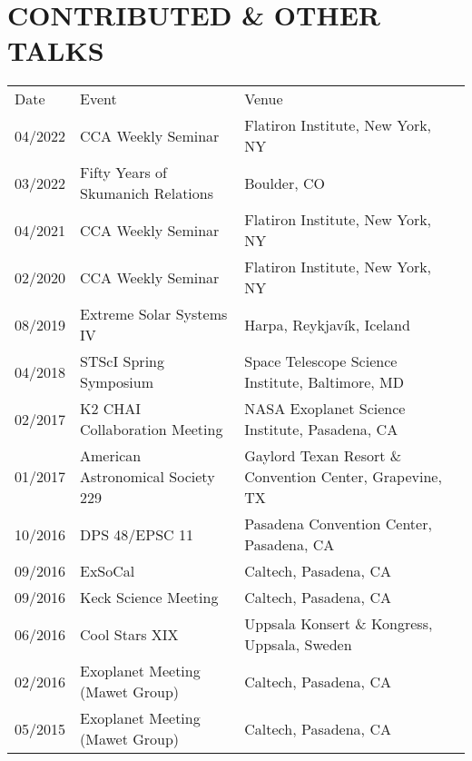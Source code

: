 \section{\large CONTRIBUTED \& OTHER TALKS}
\begin{tabular}{lll}
{\sc  Date}  & {\sc  Event} & {\sc  Venue} \\
04/2022 & CCA Weekly Seminar & Flatiron Institute, New York, NY\\
03/2022 & Fifty Years of Skumanich Relations & Boulder, CO \\
04/2021 & CCA Weekly Seminar & Flatiron Institute, New York, NY\\
02/2020 & CCA Weekly Seminar & Flatiron Institute, New York, NY\\
08/2019 & Extreme Solar Systems IV & Harpa, Reykjav\'{i}k, Iceland \\ %
04/2018 & STScI Spring Symposium & Space Telescope Science Institute, Baltimore, MD \\ %
02/2017 & K2 CHAI Collaboration Meeting & NASA Exoplanet Science Institute, Pasadena, CA \\
01/2017 & American Astronomical Society 229 & Gaylord Texan Resort \& Convention Center, Grapevine, TX \\
10/2016 & DPS 48/EPSC 11 & Pasadena Convention Center, Pasadena, CA \\
09/2016 & ExSoCal & Caltech, Pasadena, CA \\
09/2016 & Keck Science Meeting & Caltech, Pasadena, CA \\
06/2016 & Cool Stars XIX & Uppsala Konsert \& Kongress, Uppsala, Sweden \\
02/2016 & Exoplanet Meeting (Mawet Group) & Caltech, Pasadena, CA \\
05/2015 & Exoplanet Meeting (Mawet Group) & Caltech, Pasadena, CA \\
\end{tabular}
